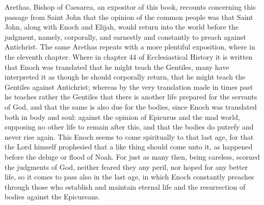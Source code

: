 Arethas, Bishop of Caesarea, an expositor of this book, recounts concerning this passage from Saint John that the opinion of the common people was that Saint John, along with Enoch and Elijah, would return into the world before the judgment, namely, corporally, and earnestly and constantly to preach against Antichrist. The same Arethas repeats with a more plentiful exposition, where in the eleventh chapter. Where in chapter 44 of Ecclesiastical History it is written that Enoch was translated that he might teach the Gentiles, many have interpreted it as though he should corporally return, that he might teach the Gentiles against Antichrist; whereas by the very translation made in times past he teaches rather the Gentiles that there is another life prepared for the servants of God, and that the same is also due for the bodies, since Enoch was translated both in body and soul: against the opinion of Epicurus and the mad world, supposing no other life to remain after this, and that the bodies do putrefy and never rise again. This Enoch seems to come spiritually to that last age, for that the Lord himself prophesied that a like thing should come unto it, as happened before the deluge or flood of Noah. For just as many then, being careless, scorned the judgments of God, neither feared they any peril, nor hoped for any better life, so it comes to pass also in the last age, in which Enoch constantly preaches through those who establish and maintain eternal life and the resurrection of bodies against the Epicureans.

